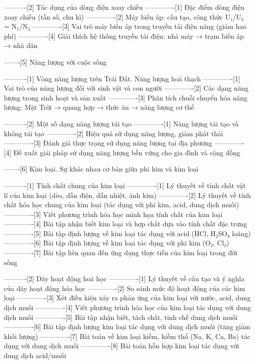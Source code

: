 ----------[2] Tác dụng của dòng điện xoay chiều
-------------[1] Đặc điểm dòng điện xoay chiều (tần số, chu kì)
-------------[2] Máy biến áp: cấu tạo, công thức U₁/U₂ = N₁/N₂
-------------[3] Vai trò máy biến áp trong truyền tải điện năng (giảm hao phí)
-------------[4] Giải thích hệ thống truyền tải điện: nhà máy → trạm biến áp → nhà dân

-------[5] Năng lượng với cuộc sống

----------[1] Vòng năng lượng trên Trái Đất. Năng lượng hoá thạch
-------------[1] Vai trò của năng lượng đối với sinh vật và con người
-------------[2] Các dạng năng lượng trong sinh hoạt và sản xuất
-------------[3] Phân tích chuỗi chuyển hóa năng lượng: Mặt Trời → quang hợp → thức ăn → năng lượng cơ thể

----------[2] Một số dạng năng lượng tái tạo
-------------[1] Năng lượng tái tạo và không tái tạo
-------------[2] Hiệu quả sử dụng năng lượng, giảm phát thải
-------------[3] Đánh giá thực trạng sử dụng năng lượng tại địa phương
-------------[4] Đề xuất giải pháp sử dụng năng lượng bền vững cho gia đình và cộng đồng

-------[6] Kim loại. Sự khác nhau cơ bản giữa phi kim và kim loại

----------[1] Tính chất chung của kim loại
-------------[1] Lý thuyết về tính chất vật lí của kim loại (dẻo, dẫn điện, dẫn nhiệt, ánh kim)
-------------[2] Lý thuyết về tính chất hóa học chung của kim loại (tác dụng với phi kim, acid, dung dịch muối)
-------------[3] Viết phương trình hóa học minh họa tính chất của kim loại
-------------[4] Bài tập nhận biết kim loại và hợp chất dựa vào tính chất đặc trưng
-------------[5] Bài tập định lượng về kim loại tác dụng với acid (HCl, H₂SO₄ loãng)
-------------[6] Bài tập định lượng về kim loại tác dụng với phi kim (O₂, Cl₂)
-------------[7] Bài tập liên quan đến ứng dụng thực tiễn của kim loại trong đời sống

----------[2] Dãy hoạt động hoá học
-------------[1] Lý thuyết về cấu tạo và ý nghĩa của dãy hoạt động hóa học
-------------[2] So sánh mức độ hoạt động của các kim loại
-------------[3] Xét điều kiện xảy ra phản ứng của kim loại với nước, acid, dung dịch muối
-------------[4] Viết phương trình hóa học của kim loại tác dụng với dung dịch muối
-------------[5] Bài tập nhận biết, tách chất, tinh chế dung dịch muối
-------------[6] Bài tập định lượng kim loại tác dụng với dung dịch muối (tăng giảm khối lượng)
-------------[7] Bài toán về kim loại kiềm, kiềm thổ (Na, K, Ca, Ba) tác dụng với dung dịch muối
-------------[8] Bài toán hỗn hợp kim loại tác dụng với dung dịch acid/muối

